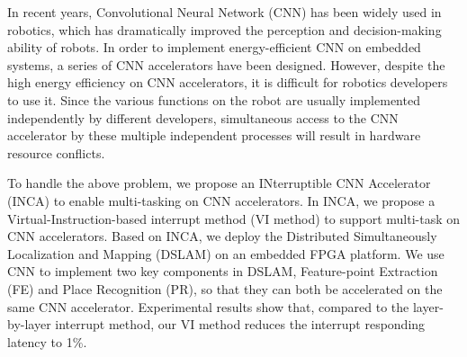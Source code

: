In recent years, Convolutional Neural Network (CNN) has been widely used in robotics, which has dramatically improved the perception and decision-making ability of robots.
In order to implement energy-efficient CNN on embedded systems, a series of CNN accelerators have been designed. However, despite the high energy efficiency on CNN accelerators, it is difficult for robotics developers to use it. Since the various functions on the robot are usually implemented independently by different developers, simultaneous access to the CNN accelerator by these multiple independent processes will result in hardware resource conflicts.

To handle the above problem, we propose an INterruptible CNN Accelerator (INCA) to enable multi-tasking on CNN accelerators. In INCA, we propose a Virtual-Instruction-based interrupt method (VI method) to support multi-task on CNN accelerators. Based on INCA, we deploy the Distributed Simultaneously Localization and Mapping (DSLAM) on an embedded FPGA platform. We use CNN to implement two key components in DSLAM, Feature-point Extraction (FE) and Place Recognition (PR), so that they can both be accelerated on the same CNN accelerator. Experimental results show that, compared to the layer-by-layer interrupt method, our VI method reduces the interrupt responding latency to 1\%.